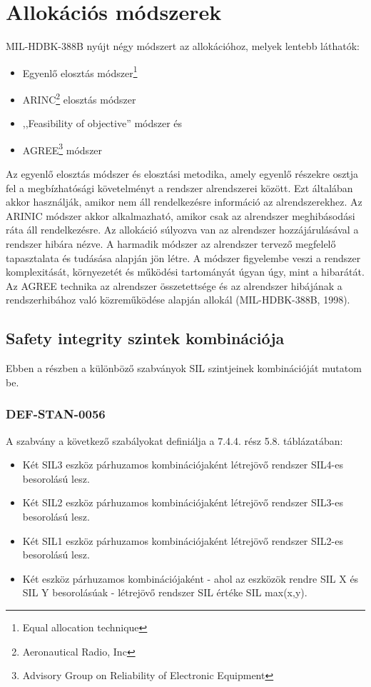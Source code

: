 \section{Allokációs módszerek}
MIL-HDBK-388B\cite{388B} nyújt négy módszert az allokációhoz, melyek lentebb láthatók:
\begin{itemize}
	\item Egyenlő elosztás módszer\footnote{Equal allocation technique}
	\item ARINC\footnote{Aeronautical Radio, Inc} elosztás módszer
	\item ,,Feasibility of objective'' módszer és
	\item AGREE\footnote{Advisory Group on Reliability of Electronic Equipment} módszer
\end{itemize}

Az egyenlő elosztás módszer és elosztási metodika, amely egyenlő részekre osztja fel a megbízhatósági követelményt a rendszer alrendszerei között.
Ezt általában akkor használják, amikor nem áll rendelkezésre információ az alrendszerekhez.
Az ARINIC módszer akkor alkalmazható, amikor csak az alrendszer meghibásodási ráta áll rendelkezésre. 
Az allokáció súlyozva van az alrendszer hozzájárulásával a rendszer hibára nézve.
A harmadik módszer az alrendszer tervező megfelelő tapasztalata és tudásása alapján jön létre.
A módszer figyelembe veszi a rendszer komplexitását, környezetét és működési tartományát úgyan úgy, mint a hibarátát.
Az AGREE technika az alrendszer összetettsége és az alrendszer hibájának a rendszerhibához való közreműködése alapján allokál (MIL-HDBK-388B, 1998).

\subsection{Safety integrity szintek kombinációja}
Ebben a részben a különböző szabványok SIL szintjeinek kombinációját mutatom be.

\subsubsection{DEF-STAN-0056}
A szabvány a következő szabályokat definiálja a 7.4.4. rész 5.8. táblázatában:
\begin{itemize}
	\item Két SIL3 eszköz párhuzamos kombinációjaként létrejövő rendszer SIL4-es besorolású lesz.
	\item Két SIL2 eszköz párhuzamos kombinációjaként létrejövő rendszer SIL3-es besorolású lesz.
	\item Két SIL1 eszköz párhuzamos kombinációjaként létrejövő rendszer SIL2-es besorolású lesz.
	\item Két eszköz párhuzamos kombinációjaként - ahol az eszközök rendre SIL X és SIL Y besorolásúak - létrejövő rendszer SIL értéke SIL max(x,y).
\end{itemize}


